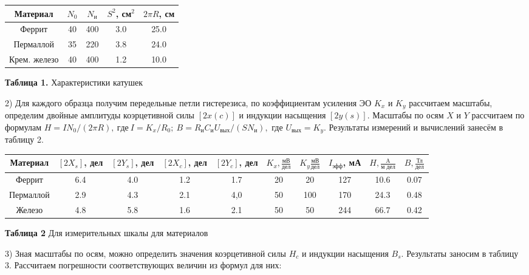 \documentclass{article}
\begin{document}
\begin{center}
    \begin{tabular}{|c|c|c|c|c|}
		\hline
		Материал     & $N_0$ & $N_\text{и}$ & $S^2$, см$^2$ & $2\pi R$, см \\ \hline
		Феррит       & 40    & 400          & 3.0           & 25.0         \\ \hline
		Пермаллой    & 35    & 220          & 3.8           & 24.0         \\ \hline
		Крем. железо & 40    & 400          & 1.2           & 10.0         \\ \hline
	\end{tabular}
	
	\textbf{Таблица 1.} Характеристики катушек
\end{center}

2) Для каждого образца получим передельные петли гистерезиса, по коэффициентам усиления ЭО $K_x$ и $K_y$ рассчитаем масштабы, определим двойные амплитуды коэрцетивной силы $ [2x(c)] $ и индукции насыщения $ [2y(s)] $. Масштабы по осям $ X $ и $ Y $ рассчитаем по формулам  $H=IN_0/(2\pi R),\ где\ I=K_x/R_0;\ B=R_\text{и}C_\text{и}U_{\text{вых}}/(SN_\text{и}),$ где $U_{\text{вых}}=K_y$. Результаты измерений и вычислений занесём в таблицу 2.

\begin{center}
    \begin{tabular}{|c|c|c|c|c|c|c|c|c|c|}
        \hline
        Материал & \([2X_{s}]\), дел & \([2Y_{s}]\), дел & \([2X_{c}]\), дел & \([2Y_{c}]\), дел & \(K_{x}, \frac{\text{мВ}}{\text{дел}}\) & \(K_{y} \frac{\text{мВ}}{\text{дел}}\) & \(I_{\text{эфф}}\), мА & \(H, \frac{\text{A}}{\text{м дел}}\) & \(B, \frac{\text{Тл}}{\text{дел}}\) \\
        \hline
        Феррит & 6.4 & 4.0 & 1.2 & 1.7 & 20 & 20 & 127 & 10.6 & 0.07 \\
        \hline
        Пермаллой & 2.9 & 4.3 & 2.1 & 4,0 & 50 & 100 & 170 & 24.3 & 0.48 \\
        \hline
        Железо & 4.8 & 5.8 & 1.6 & 2.1 & 50 & 50 & 244 & 66.7 & 0.42 \\
        \hline
    \end{tabular}
    
    \textbf{Таблица 2} Для измерительных шкалы для материалов
\end{center}

3) Зная масштабы по осям, можно определить значения коэрцетивной силы $ H_c $ и индукции насыщения $ B_s $. Результаты заносим в таблицу 3. Рассчитаем погрешности соответствующих величин из формул для них:
\end{document}
